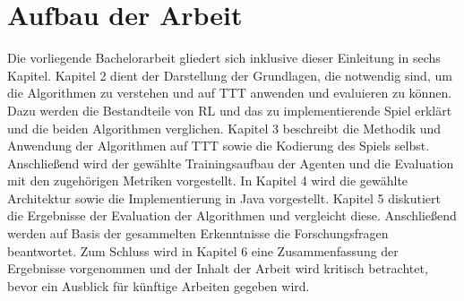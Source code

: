\section{Aufbau der Arbeit}
Die vorliegende Bachelorarbeit gliedert sich inklusive dieser Einleitung in sechs Kapitel. 
Kapitel 2 dient der Darstellung der Grundlagen, die notwendig sind, um die Algorithmen \bothAlgs zu verstehen und auf \ac{TTT} anwenden und evaluieren zu können. 
Dazu werden die Bestandteile von \ac{RL} und das zu implementierende Spiel erklärt und die beiden Algorithmen verglichen. 
Kapitel 3 beschreibt die Methodik und Anwendung der Algorithmen auf \ac{TTT} sowie die Kodierung des Spiels selbst. 
Anschließend wird der gewählte Trainingsaufbau der Agenten und die Evaluation mit den zugehörigen Metriken vorgestellt. 
In Kapitel 4 wird die gewählte Architektur sowie die Implementierung in Java vorgestellt. 
Kapitel 5 diskutiert die Ergebnisse der Evaluation der Algorithmen und vergleicht diese. 
Anschließend werden auf Basis der gesammelten Erkenntnisse die Forschungsfragen beantwortet. 
Zum Schluss wird in Kapitel 6 eine Zusammenfassung der Ergebnisse vorgenommen und der Inhalt der Arbeit wird kritisch betrachtet, bevor ein Ausblick für künftige Arbeiten gegeben wird.


 
